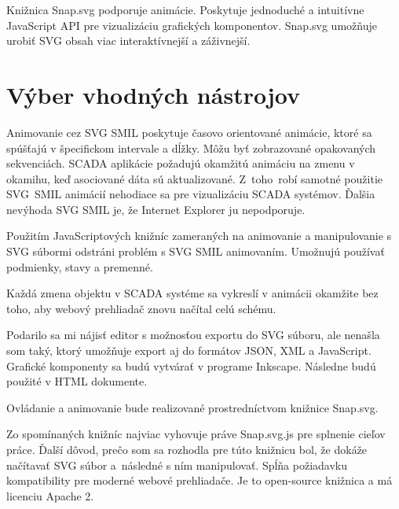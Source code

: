 Knižnica Snap.svg podporuje animácie. Poskytuje jednoduché a intuitívne JavaScript API pre vizualizáciu grafických komponentov. Snap.svg umožňuje urobiť SVG obsah viac interaktívnejší a záživnejší. \cite{snapsvg}

\section{Výber vhodných nástrojov}


Animovanie cez SVG \acs{SMIL} poskytuje  časovo orientované animácie, ktoré sa spúšťajú v špecifickom intervale a dĺžky. Môžu byť  zobrazované opakovaných sekvenciách. SCADA aplikácie požadujú okamžitú animáciu na zmenu v okamihu, keď  asociované dáta sú aktualizované. Z~toho~robí samotné použitie SVG~SMIL animácií nehodiace sa pre vizualizáciu SCADA systémov. Ďalšia nevýhoda SVG SMIL je, že Internet Explorer ju nepodporuje.

Použitím JavaScriptových knižníc zameraných na animovanie a manipulovanie s SVG súbormi odstráni problém s SVG SMIL animovaním. Umožnujú používať podmienky, stavy a premenné.

Každá zmena objektu v SCADA systéme sa vykreslí v animácii okamžite bez toho, aby webový prehliadač znovu načítal celú schému. 


 Podarilo sa mi nájisť editor s možnosťou exportu do SVG súboru, ale nenašla som taký, ktorý umožňuje export aj do formátov JSON, XML a JavaScript. Grafické komponenty sa budú vytvárať v programe Inkscape. Následne budú použité v HTML dokumente.

Ovládanie a animovanie bude realizované prostredníctvom knižnice Snap.svg. 

Zo spomínaných knižníc najviac vyhovuje práve Snap.svg.js pre splnenie cieľov práce. Ďalší dôvod, prečo som sa rozhodla pre túto  knižnicu bol, že dokáže načítavať SVG súbor a~následné s ním manipulovať. Spĺňa požiadavku kompatibility pre moderné webové prehliadače. Je to open-source knižnica a má licenciu Apache 2.
